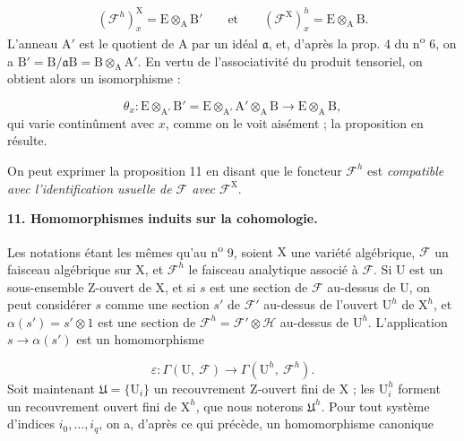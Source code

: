 \begin{equation*}
(\mathcal{F}^h)^{\mathrm{X}}_{x} = \mathrm{E} \otimes_\mathrm{A} \mathrm{B}' \qquad \mathrm{et} \qquad (\mathcal{F}^{\mathrm{X}})^{h}_{x} = \mathrm{E} \otimes_\mathrm{A} \mathrm{B}.
\end{equation*}
L'anneau $\mathrm{A}'$ est le quotient de $\mathrm{A}$ par un idéal $\mathfrak{a}$, et, d'après la prop. 4 du n\textsuperscript{o} 6, on a $\mathrm{B}' = \mathrm{B}/\mathfrak{a}\mathrm{B} = \mathrm{B} \otimes_\mathrm{A} \mathrm{A}'$. En vertu de l'associativité du produit tensoriel, on obtient alors un isomorphisme :

\begin{equation*}
\theta_x : \mathrm{E} \otimes_{\mathrm{A}'} \mathrm{B}' = \mathrm{E} \otimes_{\mathrm{A}'} \mathrm{A}' \otimes_\mathrm{A} \mathrm{B} \to \mathrm{E} \otimes_\mathrm{A} \mathrm{B},
\end{equation*}
qui varie continûment avec $x$, comme on le voit aisément ; la proposition en résulte.

On peut exprimer la proposition 11 en disant que le foncteur $\mathcal{F}^h$ est \emph{compatible avec l'identification usuelle de $\mathcal{F}$ avec $\mathcal{F}^\mathrm{X}$}.


\textbf{11. Homomorphismes induits sur la cohomologie.}

Les notations étant les mêmes qu'au n\textsuperscript{o} 9, soient $\mathrm{X}$ une variété algébrique, $\mathcal{F}$ un faisceau algébrique sur $\mathrm{X}$, et $\mathcal{F}^h$ le faisceau analytique associé à $\mathcal{F}$. Si $\mathrm{U}$ est un sous-ensemble Z-ouvert de $\mathrm{X}$, et si $s$ est une section de $\mathcal{F}$ au-dessus de $\mathrm{U}$, on peut considérer $s$ comme une section $s'$ de $\mathcal{F}'$ au-dessus de l'ouvert $\mathrm{U}^h$ de $\mathrm{X}^h$, et $\alpha(s') = s' \otimes 1$ est une section de $\mathcal{F}^h = \mathcal{F}' \otimes \mathcal{H}$ au-dessus de $\mathrm{U}^h$. L'application $s \to \alpha(s')$ est un homomorphisme

\begin{equation*}
\varepsilon : \Gamma(\mathrm{U}, \ \mathcal{F}) \to \Gamma(\mathrm{U}^h, \ \mathcal{F}^h).
\end{equation*}
Soit maintenant $\mathfrak{U} = \{\mathrm{U}_i\}$ un recouvrement Z-ouvert fini de $\mathrm{X}$ ; les $\mathrm{U}_i^h$ forment un recouvrement ouvert fini de $\mathrm{X}^h$, que nous noterons $\mathfrak{U}^h$. Pour tout système d'indices $i_0, \ldots, i_q$, on a, d'après ce qui précède, un homomorphisme canonique

